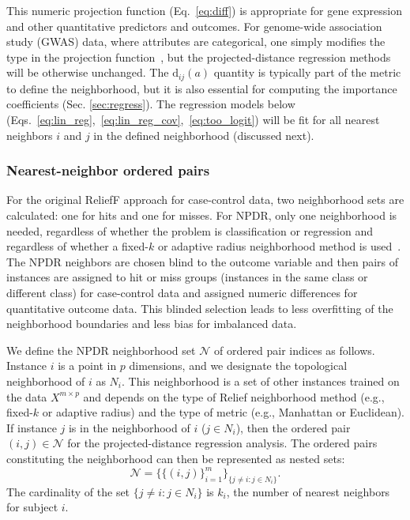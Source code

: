 \documentclass[10pt]{article}
\begin{document}
This numeric projection function (Eq.~\ref{eq:diff}) is appropriate for gene expression and other quantitative predictors and outcomes. For genome-wide association study (GWAS) data, where attributes are categorical, one simply modifies the type in the projection function~\cite{titv}, but the projected-distance regression methods will be otherwise unchanged. The $\text{d}_{ij}(a)$ quantity is typically part of the metric to define the neighborhood, but it is also essential for computing the importance coefficients (Sec. \ref{sec:regress}).  The regression models below (Eqs.~\ref{eq:lin_reg},~\ref{eq:lin_reg_cov},~\ref{eq:too_logit}) will be fit for all nearest neighbors $i$ and $j$ in the defined neighborhood (discussed next). 

\subsubsection{Nearest-neighbor ordered pairs}
For the original ReliefF approach for case-control data, two neighborhood sets are calculated: one for hits and one for misses. For NPDR, only one neighborhood is needed, regardless of whether the problem is classification or regression and regardless of whether a fixed-$k$ or adaptive radius neighborhood method is used~\cite{greene09,urbanowicz17,mckinney13}. The NPDR neighbors are chosen blind to the outcome variable and then pairs of instances are assigned to hit or miss groups (instances in the same class or different class) for case-control data and assigned numeric differences for quantitative outcome data. This blinded selection leads to less overfitting of the neighborhood boundaries and less bias for imbalanced data.     

We define the NPDR neighborhood set $\mathcal{N}$ of ordered pair indices as follows. Instance $i$ is a point in $p$ dimensions, and we designate the topological neighborhood of $i$ as $N_{i}$. This neighborhood is a set of other instances trained on the data $X^{m \times p}$ and depends on the type of Relief neighborhood method (e.g., fixed-$k$ or adaptive radius) and the type of metric (e.g., Manhattan or Euclidean). If instance $j$ is in the neighborhood of $i$ ($j \in N_{i}$), then the ordered pair $(i,j) \in \mathcal{N}$ for the projected-distance regression analysis. The ordered pairs constituting the neighborhood can then be represented as nested sets:
\begin{equation}\label{eq:N}
\mathcal{N}=\{\{(i, j)\}_{i=1}^{m}\}_{\{j \ne i : j \in N_{i}\}}.
\end{equation}
The cardinality of the set $\{j \ne i : j \in N_{i}\}$ is $k_i$, the number of nearest neighbors for subject $i$. 
\end{document}
